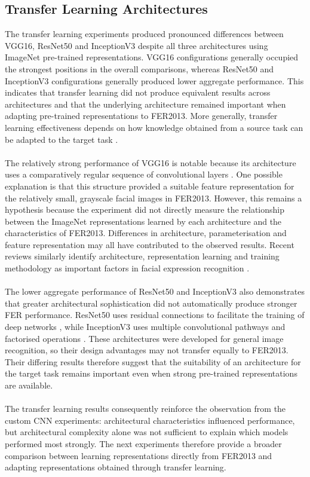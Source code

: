 \documentclass[12pt, a4paper]{report}
\let\oldsubsection\subsection
\renewcommand{\subsection}{%
    \Needspace{6\baselineskip}%
    \oldsubsection
}
\begin{document}
			\subsection{Transfer Learning Architectures}
				
				The transfer learning experiments produced pronounced differences between VGG16, ResNet50 and InceptionV3 despite all three architectures using ImageNet pre-trained representations. VGG16 configurations generally occupied the strongest positions in the overall comparisons, whereas ResNet50 and InceptionV3 configurations generally produced lower aggregate performance. This indicates that transfer learning did not produce equivalent results across architectures and that the underlying architecture remained important when adapting pre-trained representations to FER2013. More generally, transfer learning effectiveness depends on how knowledge obtained from a source task can be adapted to the target task \cite{Pan2010TransferLearning}.\\\\
				The relatively strong performance of VGG16 is notable because its architecture uses a comparatively regular sequence of convolutional layers \cite{simonyan2015vgg}. One possible explanation is that this structure provided a suitable feature representation for the relatively small, grayscale facial images in FER2013. However, this remains a hypothesis because the experiment did not directly measure the relationship between the ImageNet representations learned by each architecture and the characteristics of FER2013. Differences in architecture, parameterisation and feature representation may all have contributed to the observed results. Recent reviews similarly identify architecture, representation learning and training methodology as important factors in facial expression recognition \cite{Georgiou2026FERReview, Sutar2023DeepFER}.\\\\
				The lower aggregate performance of ResNet50 and InceptionV3 also demonstrates that greater architectural sophistication did not automatically produce stronger FER performance. ResNet50 uses residual connections to facilitate the training of deep networks \cite{he2016resnet}, while InceptionV3 uses multiple convolutional pathways and factorised operations \cite{szegedy2016inception}. These architectures were developed for general image recognition, so their design advantages may not transfer equally to FER2013. Their differing results therefore suggest that the suitability of an architecture for the target task remains important even when strong pre-trained representations are available.\\\\
				The transfer learning results consequently reinforce the observation from the custom CNN experiments: architectural characteristics influenced performance, but architectural complexity alone was not sufficient to explain which models performed most strongly. The next experiments therefore provide a broader comparison between learning representations directly from FER2013 and adapting representations obtained through transfer learning.
				
\end{document}
